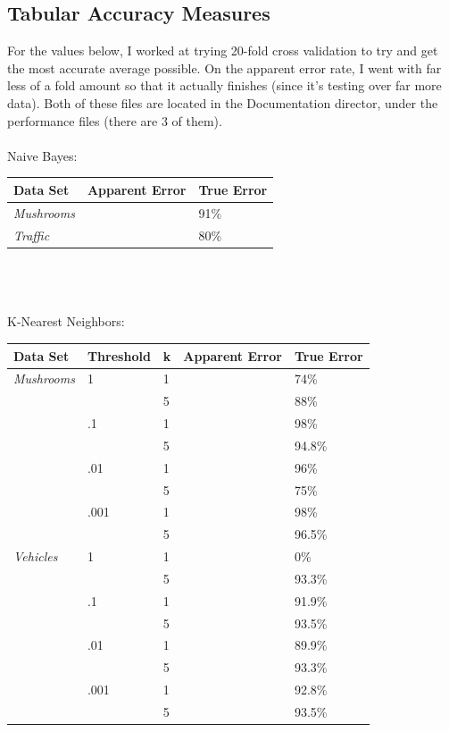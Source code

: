 \documentclass{article}
\begin{document}
\subsection{Tabular Accuracy Measures}
For the values below, I worked at trying 20-fold cross validation to try and get the most accurate average possible.  On the apparent error rate, I went with far less of a fold amount so that it actually finishes (since it's testing over far more data).  Both of these files are located in the Documentation director, under the performance files (there are 3 of them).
\\ \\
Naive Bayes:\\
\begin{tabular}{ | l | l | l |}
  \hline
  \textbf{Data Set} & \textbf{Apparent Error} & \textbf{True Error} \\ \hline
  \textit{Mushrooms} & & 91\% \\ \hline
  \textit{Traffic} & & 80\% \\ \hline
\end{tabular}
\\ \\ \\
K-Nearest Neighbors:\\
\begin{tabular}{ | l | l | l | l | l | }
  \hline			
  \textbf{Data Set} & Threshold & k & \textbf{Apparent Error} & \textbf{True Error} \\ \hline
  \textit{Mushrooms} & 1 & 1 & & 74\% \\
  & & 5 & & 88\% \\
  & .1 & 1 & & 98\% \\
  & & 5 & & 94.8\% \\
  & .01 & 1 & & 96\% \\
  & & 5 & & 75\% \\
  & .001 & 1 & & 98\% \\
  & & 5 & & 96.5\% \\ \hline
  \textit{Vehicles} & 1 & 1 & & 0\% \\
  & & 5 & & 93.3\% \\
  & .1 & 1 & & 91.9\% \\
  & & 5 & & 93.5\% \\
  & .01 & 1 & & 89.9\% \\
  & & 5 & & 93.3\% \\
  & .001 & 1 & & 92.8\% \\
  & & 5 & & 93.5\% \\ \hline
\end{tabular}
\end{document}

